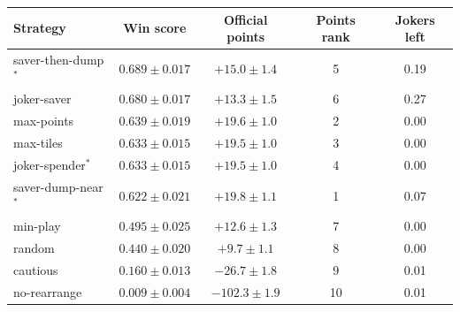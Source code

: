 \begin{tabular}{@{}lcccc@{}}\toprule
Strategy & Win score & Official points & Points rank & Jokers left\\\midrule
saver-then-dump$^*$ & $0.689\pm0.017$ & $+15.0\pm1.4$ & 5 & 0.19 \\
joker-saver & $0.680\pm0.017$ & $+13.3\pm1.5$ & 6 & 0.27 \\
max-points & $0.639\pm0.019$ & $+19.6\pm1.0$ & 2 & 0.00 \\
max-tiles & $0.633\pm0.015$ & $+19.5\pm1.0$ & 3 & 0.00 \\
joker-spender$^*$ & $0.633\pm0.015$ & $+19.5\pm1.0$ & 4 & 0.00 \\
saver-dump-near$^*$ & $0.622\pm0.021$ & $+19.8\pm1.1$ & 1 & 0.07 \\
min-play & $0.495\pm0.025$ & $+12.6\pm1.3$ & 7 & 0.00 \\
random & $0.440\pm0.020$ & $+9.7\pm1.1$ & 8 & 0.00 \\
cautious & $0.160\pm0.013$ & $-26.7\pm1.8$ & 9 & 0.01 \\
no-rearrange & $0.009\pm0.004$ & $-102.3\pm1.9$ & 10 & 0.01 \\
\bottomrule
\end{tabular}
